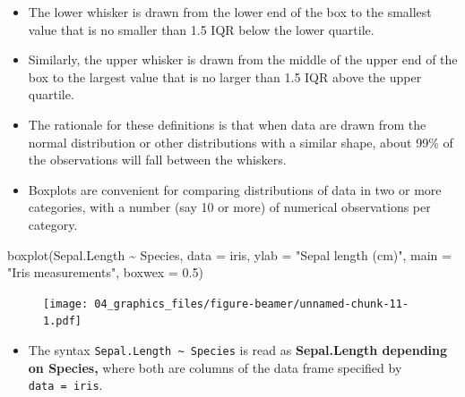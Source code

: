 \documentclass[
  9pt,
  a4paper,
  ignorenonframetext,
  notheorems]{beamer}
\newenvironment{Shaded}{\begin{snugshade}}{\end{snugshade}}
\newcommand{\AttributeTok}[1]{\textcolor[rgb]{0.40,0.45,0.13}{#1}}
\newcommand{\FloatTok}[1]{\textcolor[rgb]{0.68,0.00,0.00}{#1}}
\newcommand{\FunctionTok}[1]{\textcolor[rgb]{0.28,0.35,0.67}{#1}}
\newcommand{\NormalTok}[1]{\textcolor[rgb]{0.00,0.23,0.31}{#1}}
\newcommand{\SpecialCharTok}[1]{\textcolor[rgb]{0.37,0.37,0.37}{#1}}
\newcommand{\StringTok}[1]{\textcolor[rgb]{0.13,0.47,0.30}{#1}}
\providecommand{\tightlist}{%
  \setlength{\itemsep}{0pt}\setlength{\parskip}{0pt}}\usepackage{longtable,booktabs,array}
\begin{document}
\begin{frame}
\begin{itemize}
\item
  The lower whisker is drawn from the lower end of the box to the
  smallest value that is no smaller than 1.5 IQR below the lower
  quartile.
\item
  Similarly, the upper whisker is drawn from the middle of the upper end
  of the box to the largest value that is no larger than 1.5 IQR above
  the upper quartile.
\item
  The rationale for these definitions is that when data are drawn from
  the normal distribution or other distributions with a similar shape,
  about 99\% of the observations will fall between the whiskers.
\item
  Boxplots are convenient for comparing distributions of data in two or
  more categories, with a number (say 10 or more) of numerical
  observations per category.
\end{itemize}
\end{frame}

\begin{frame}[fragile]
\begin{Shaded}
\begin{Highlighting}[]
\FunctionTok{boxplot}\NormalTok{(Sepal.Length }\SpecialCharTok{\textasciitilde{}}\NormalTok{ Species, }\AttributeTok{data =}\NormalTok{ iris, }\AttributeTok{ylab =} \StringTok{"Sepal length (cm)"}\NormalTok{, }
        \AttributeTok{main =} \StringTok{"Iris measurements"}\NormalTok{, }\AttributeTok{boxwex =} \FloatTok{0.5}\NormalTok{)}
\end{Highlighting}
\end{Shaded}

\begin{figure}

{\centering \texttt{[image: 04\_graphics\_files/figure-beamer/unnamed-chunk-11-1.pdf]}

}

\end{figure}

\begin{itemize}
\tightlist
\item
  The syntax \texttt{Sepal.Length\ \textasciitilde{}\ Species} is read
  as \textbf{Sepal.Length depending on Species,} where both are columns
  of the data frame specified by \texttt{data\ =\ iris}.
\end{itemize}
\end{frame}
\end{document}
